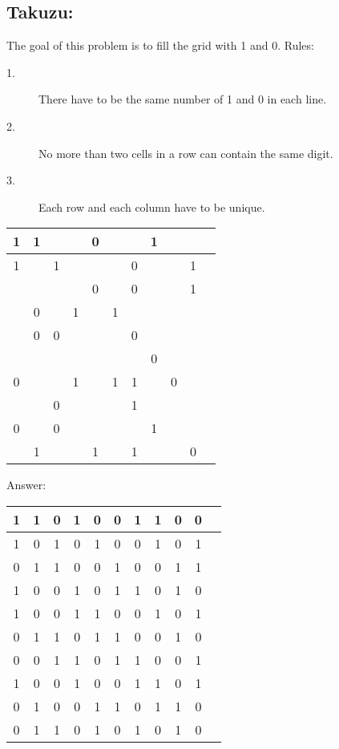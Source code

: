 \documentclass{article}
\begin{document}
\subsection*{Takuzu:}
The goal of this problem is to fill the grid with 1 and 0. 
Rules:
\begin{description}
\item[1.] There have to be the same number of 1 and 0 in each line.
\item[2.] No more than two cells in a row can contain the same digit.
\item[3.] Each row and each column have to be unique.
\end{description}

\begin{table}[ht]
\centering
\begin{tabular}{|c|c|c|c|c|c|c|c|c|c|c|}
\hline 1 & 1 &   &   & 0 &   &   & 1 &   &   \\ 
\hline 1 &   & 1 &   &   &   & 0 &   &   & 1 \\ 
\hline   &   &   &   & 0 &   & 0 &   &   & 1 \\ 
\hline   & 0 &   & 1 &   & 1 &   &   &   &   \\ 
\hline   & 0 & 0 &   &   &   & 0 &   &   &   \\ 
\hline   &   &   &   &   &   &   & 0 &   &   \\ 
\hline 0 &   &   & 1 &   & 1 & 1 &   & 0 &   \\ 
\hline   &   & 0 &   &   &   & 1 &   &   &   \\ 
\hline 0 &   & 0 &   &   &   &   & 1 &   &   \\ 
\hline   & 1 &   &   & 1 &   & 1 &   &   & 0 \\
\hline
\end{tabular}
\end{table} 

Answer:
\begin{table}[ht]
\centering
\begin{tabular}{|c|c|c|c|c|c|c|c|c|c|c|}
\hline 1 & 1 & 0 & 1 & 0 & 0 & 1 & 1 & 0 & 0 \\ 
\hline 1 & 0 & 1 & 0 & 1 & 0 & 0 & 1 & 0 & 1 \\ 
\hline 0 & 1 & 1 & 0 & 0 & 1 & 0 & 0 & 1 & 1 \\ 
\hline 1 & 0 & 0 & 1 & 0 & 1 & 1 & 0 & 1 & 0 \\ 
\hline 1 & 0 & 0 & 1 & 1 & 0 & 0 & 1 & 0 & 1 \\ 
\hline 0 & 1 & 1 & 0 & 1 & 1 & 0 & 0 & 1 & 0 \\ 
\hline 0 & 0 & 1 & 1 & 0 & 1 & 1 & 0 & 0 & 1 \\ 
\hline 1 & 0 & 0 & 1 & 0 & 0 & 1 & 1 & 0 & 1 \\ 
\hline 0 & 1 & 0 & 0 & 1 & 1 & 0 & 1 & 1 & 0 \\ 
\hline 0 & 1 & 1 & 0 & 1 & 0 & 1 & 0 & 1 & 0 \\
\hline
\end{tabular}
\end{table} 
\end{document}
